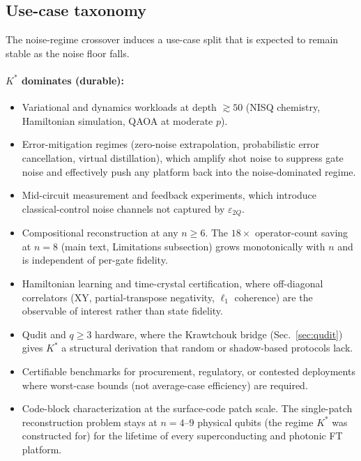 \documentclass[twocolumn,prx,aps,superscriptaddress,longbibliography]{revtex4-2}
\begin{document}
\subsection{Use-case taxonomy}
\label{sm:longevity-usecases}

The noise-regime crossover induces a use-case split that is
expected to remain stable as the noise floor falls.

\paragraph*{$K^*$ dominates (durable):}
\begin{itemize}
\item Variational and dynamics workloads at depth $\gtrsim 50$
  (NISQ chemistry, Hamiltonian simulation, QAOA at moderate $p$).
\item Error-mitigation regimes (zero-noise extrapolation,
  probabilistic error cancellation, virtual distillation), which
  amplify shot noise to suppress gate noise and effectively push
  any platform back into the noise-dominated regime.
\item Mid-circuit measurement and feedback experiments, which
  introduce classical-control noise channels not captured by
  $\varepsilon_{2Q}$.
\item Compositional reconstruction at any $n \ge 6$.  The
  $18\times$ operator-count saving at $n = 8$
  (main text, Limitations subsection) grows monotonically
  with $n$ and is independent of per-gate fidelity.
\item Hamiltonian learning and time-crystal certification, where
  off-diagonal correlators (XY, partial-transpose negativity,
  $\ell_1$ coherence) are the observable of interest rather than
  state fidelity.
\item Qudit and $q \ge 3$ hardware, where the Krawtchouk bridge
  (Sec.~\ref{sec:qudit}) gives $K^*$ a structural derivation that
  random or shadow-based protocols lack.
\item Certifiable benchmarks for procurement, regulatory, or
  contested deployments where worst-case bounds (not average-case
  efficiency) are required.
\item Code-block characterization at the surface-code patch scale.
  The single-patch reconstruction problem stays at $n = 4$--$9$
  physical qubits (the regime $K^*$ was constructed for) for the
  lifetime of every superconducting and photonic FT platform.
\end{itemize}
\end{document}
